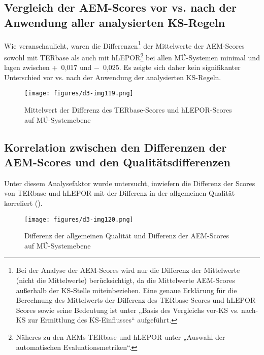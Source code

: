 \subsection{Vergleich der AEM-Scores vor vs. nach der Anwendung aller analysierten KS-Regeln}
\label{sec:5.4.8}

Wie  veranschaulicht, waren die Differenzen\footnote{\textrm{Bei der Analyse der AEM-Scores wird nur die Differenz der Mittelwerte (nicht die Mittelwerte) berücksichtigt, da die Mittelwerte AEM-Scores außerhalb der KS-Stelle miteinbeziehen. Eine genaue Erklärung für die Berechnung des Mittelwerts der Differenz des TERbase-Scores und hLEPOR-Scores sowie seine Bedeutung ist unter  „Basis des Vergleichs vor-KS vs. nach-KS zur Ermittlung des KS-Einflusses“ aufgeführt.}} der Mittelwerte der AEM-Scores sowohl mit TERbase als auch mit hLEPOR\footnote{\textrm{Näheres zu den AEMs TERbase und hLEPOR unter  „Auswahl der automatischen Evaluationsmetriken“.}} bei allen MÜ-Systemen minimal und lagen zwischen +~0,017 und $-$~0,025. Es zeigte sich daher kein signifikanter Unterschied vor vs. nach der Anwendung der analysierten KS-Regeln.


\begin{figure}
\texttt{[image: figures/d3-img119.png]}
\caption{\label{fig:05:147}Mittelwert der Differenz des TERbase-Scores und hLEPOR-Scores auf MÜ-Systemebene   }
\end{figure}


\subsection{Korrelation zwischen den Differenzen der AEM-Scores und den Qualitätsdifferenzen}
\label{sec:5.4.9}

Unter diesem Analysefaktor wurde untersucht, inwiefern die Differenz der Scores von TERbase und hLEPOR mit der Differenz in der allgemeinen Qualität korreliert ().


\begin{figure}
\texttt{[image: figures/d3-img120.png]}





\caption{\label{fig:05:148}Differenz der allgemeinen Qualität und Differenz der AEM-Scores auf MÜ-Systemebene   }
\end{figure}

